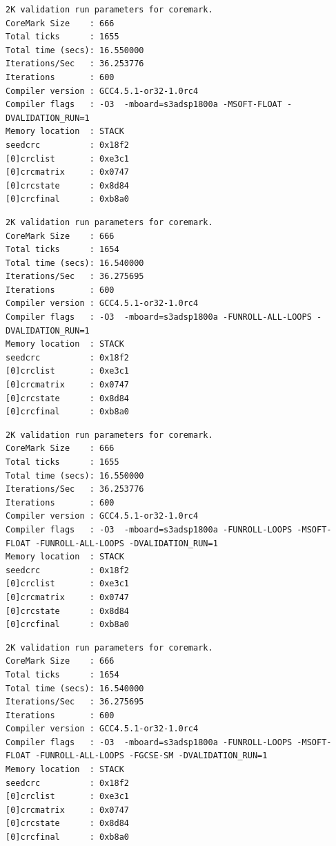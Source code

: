 \begin{lstlisting}[frame=single,caption={Optimización nivel -O3},label={lst:salidas},breaklines]
2K validation run parameters for coremark.
CoreMark Size    : 666
Total ticks      : 1655
Total time (secs): 16.550000
Iterations/Sec   : 36.253776
Iterations       : 600
Compiler version : GCC4.5.1-or32-1.0rc4
Compiler flags   : -O3  -mboard=s3adsp1800a -MSOFT-FLOAT -DVALIDATION_RUN=1  
Memory location  : STACK
seedcrc          : 0x18f2
[0]crclist       : 0xe3c1
[0]crcmatrix     : 0x0747
[0]crcstate      : 0x8d84
[0]crcfinal      : 0xb8a0
\end{lstlisting}
\begin{lstlisting}[frame=single,caption={Optimización nivel -O3},label={lst:salidas},breaklines]
2K validation run parameters for coremark.
CoreMark Size    : 666
Total ticks      : 1654
Total time (secs): 16.540000
Iterations/Sec   : 36.275695
Iterations       : 600
Compiler version : GCC4.5.1-or32-1.0rc4
Compiler flags   : -O3  -mboard=s3adsp1800a -FUNROLL-ALL-LOOPS -DVALIDATION_RUN=1  
Memory location  : STACK
seedcrc          : 0x18f2
[0]crclist       : 0xe3c1
[0]crcmatrix     : 0x0747
[0]crcstate      : 0x8d84
[0]crcfinal      : 0xb8a0
\end{lstlisting}
\begin{lstlisting}[frame=single,caption={Optimización nivel -O3},label={lst:salidas},breaklines]
2K validation run parameters for coremark.
CoreMark Size    : 666
Total ticks      : 1655
Total time (secs): 16.550000
Iterations/Sec   : 36.253776
Iterations       : 600
Compiler version : GCC4.5.1-or32-1.0rc4
Compiler flags   : -O3  -mboard=s3adsp1800a -FUNROLL-LOOPS -MSOFT-FLOAT -FUNROLL-ALL-LOOPS -DVALIDATION_RUN=1  
Memory location  : STACK
seedcrc          : 0x18f2
[0]crclist       : 0xe3c1
[0]crcmatrix     : 0x0747
[0]crcstate      : 0x8d84
[0]crcfinal      : 0xb8a0
\end{lstlisting}
\begin{lstlisting}[frame=single,caption={Optimización nivel -O3},label={lst:salidas},breaklines]
2K validation run parameters for coremark.
CoreMark Size    : 666
Total ticks      : 1654
Total time (secs): 16.540000
Iterations/Sec   : 36.275695
Iterations       : 600
Compiler version : GCC4.5.1-or32-1.0rc4
Compiler flags   : -O3  -mboard=s3adsp1800a -FUNROLL-LOOPS -MSOFT-FLOAT -FUNROLL-ALL-LOOPS -FGCSE-SM -DVALIDATION_RUN=1  
Memory location  : STACK
seedcrc          : 0x18f2
[0]crclist       : 0xe3c1
[0]crcmatrix     : 0x0747
[0]crcstate      : 0x8d84
[0]crcfinal      : 0xb8a0
\end{lstlisting}

